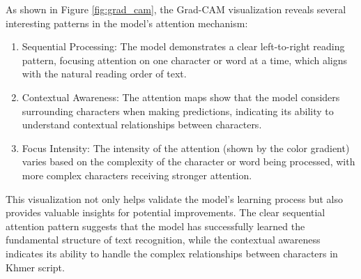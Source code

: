 As shown in Figure \ref{fig:grad_cam}, the Grad-CAM visualization reveals several interesting patterns in the model's 
attention mechanism:

\begin{enumerate}
    \item Sequential Processing: The model demonstrates a clear left-to-right reading pattern, focusing attention 
    on one character or word at a time, which aligns with the natural reading order of text.
    
    \item Contextual Awareness: The attention maps show that the model considers surrounding characters when 
    making predictions, indicating its ability to understand contextual relationships between characters.
    
    \item Focus Intensity: The intensity of the attention (shown by the color gradient) varies based on the 
    complexity of the character or word being processed, with more complex characters receiving stronger attention.
\end{enumerate}

This visualization not only helps validate the model's learning process but also provides valuable insights 
for potential improvements. The clear sequential attention pattern suggests that the model has successfully 
learned the fundamental structure of text recognition, while the contextual awareness indicates its ability to 
handle the complex relationships between characters in Khmer script.